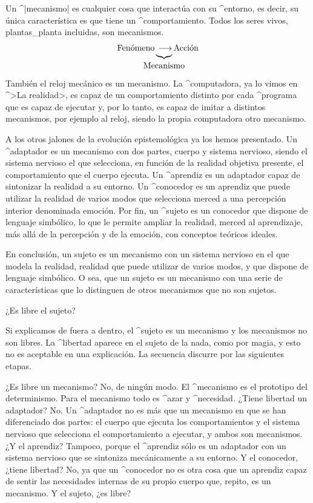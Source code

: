 Un ^|mecanismo| es cualquier cosa que interactúa con su ^{entorno}, es
decir, su única característica es que tiene un ^{comportamiento}. Todos
los seres vivos, plantas_{planta} incluidas, son mecanismos.
$$\hbox{\strut Fenómeno}
  \underbrace{\strut \longrightarrow}_{\hidewidth
   \hbox{\strut Mecanismo}\hidewidth}
  \hbox{\strut Acción}
\abovedisplayskip=9pt plus 3pt
\belowdisplayskip=9pt plus 3pt
$$
También el reloj mecánico es un mecanismo. La ^{computadora}, ya lo
vimos en ^>La realidad>, es capaz de un comportamiento distinto por cada
^{programa} que es capaz de ejecutar y, por lo tanto, es capaz de imitar
a distintos mecanismos, por ejemplo al reloj, siendo la propia
computadora otro mecanismo.

A los otros jalones de la evolución epistemológica ya los hemos
presentado. Un ^{adaptador} es un mecanismo con dos partes, cuerpo y
sistema nervioso, siendo el sistema nervioso el que selecciona, en
función de la realidad objetiva presente, el comportamiento que el
cuerpo ejecuta. Un ^{aprendiz} es un adaptador capaz de sintonizar la
realidad a su entorno. Un ^{conocedor} es un aprendiz que puede utilizar
la realidad de varios modos que selecciona merced a una percepción
interior denominada emoción. Por fin, un ^{sujeto} es un conocedor que
dispone de lenguaje simbólico, lo que le permite ampliar la realidad,
merced al aprendizaje, más allá de la percepción y de la emoción, con
conceptos teóricos ideales.

En conclusión, un sujeto es un mecanismo con un sistema nervioso en el
que modela la realidad, realidad que puede utilizar de varios modos, y
que dispone de lenguaje simbólico. O sea, que un sujeto es un mecanismo
con una serie de características que lo distinguen de otros mecanismos
que no son sujetos.


\Section ¿Es libre el sujeto?

Si explicamos de fuera a dentro, el ^{sujeto} es un mecanismo y los
mecanismos no son libres. La ^{libertad} aparece en el sujeto de la
nada, como por magia, y esto no es aceptable en una explicación. La
secuencia discurre por las siguientes etapas.

¿Es libre un mecanismo? No, de ningún modo. El ^{mecanismo} es el
prototipo del determinismo. Para el mecanismo todo es ^{azar} y
^{necesidad}. ¿Tiene libertad un adaptador? No. Un ^{adaptador} no es
más que un mecanismo en que se han diferenciado dos partes: el cuerpo
que ejecuta los comportamientos y el sistema nervioso que selecciona el
comportamiento a ejecutar, y ambos son mecanismos. ¿Y el aprendiz?
Tampoco, porque el ^{aprendiz} sólo es un adaptador con un sistema
nervioso que se sintoniza mecánicamente a su entorno. Y el conocedor,
¿tiene libertad? No, ya que un ^{conocedor} no es otra cosa que un
aprendiz capaz de sentir las necesidades internas de su propio cuerpo
que, repito, es un mecanismo. Y el sujeto, ¿es libre?

